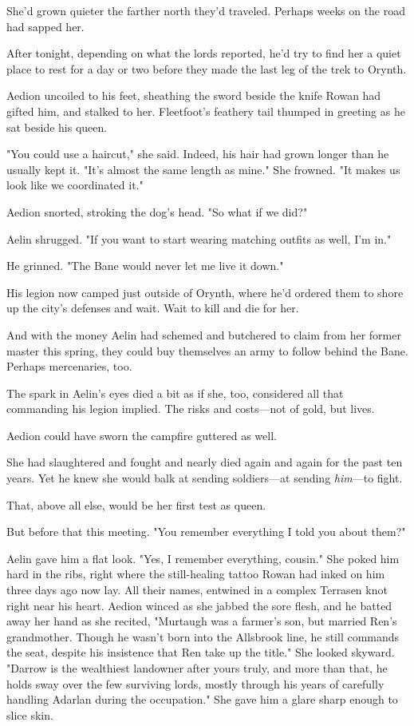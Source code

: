 She'd grown quieter the farther north they'd traveled. Perhaps weeks on the road had sapped her.

After tonight, depending on what the lords reported, he'd try to find her a quiet place to rest for a day or two before they made the last leg of the trek to Orynth.

Aedion uncoiled to his feet, sheathing the sword beside the knife Rowan had gifted him, and stalked to her. Fleetfoot's feathery tail thumped in greeting as he sat beside his queen.

"You could use a haircut," she said. Indeed, his hair had grown longer than he usually kept it. "It's almost the same length as mine." She frowned. "It makes us look like we coordinated it."

Aedion snorted, stroking the dog's head. "So what if we did?"

Aelin shrugged. "If you want to start wearing matching outfits as well, I'm in."

He grinned. "The Bane would never let me live it down."

His legion now camped just outside of Orynth, where he'd ordered them to shore up the city's defenses and wait. Wait to kill and die for her.

And with the money Aelin had schemed and butchered to claim from her former master this spring, they could buy themselves an army to follow behind the Bane. Perhaps mercenaries, too.

The spark in Aelin's eyes died a bit as if she, too, considered all that commanding his legion implied. The risks and costs---not of gold, but lives.

Aedion could have sworn the campfire guttered as well.

She had slaughtered and fought and nearly died again and again for the past ten years. Yet he knew she would balk at sending soldiers---at sending \emph{him}---to fight.

That, above all else, would be her first test as queen.

But before that  this meeting. "You remember everything I told you about them?"

Aelin gave him a flat look. "Yes, I remember everything, cousin." She poked him hard in the ribs, right where the still-healing tattoo Rowan had inked on him three days ago now lay. All their names, entwined in a complex Terrasen knot right near his heart. Aedion winced as she jabbed the sore flesh, and he batted away her hand as she recited, "Murtaugh was a farmer's son, but married Ren's grandmother. Though he wasn't born into the Allsbrook line, he still commands the seat, despite his insistence that Ren take up the title." She looked skyward. "Darrow is the wealthiest landowner after yours truly, and more than that, he holds sway over the few surviving lords, mostly through his years of carefully handling Adarlan during the occupation." She gave him a glare sharp enough to slice skin.

